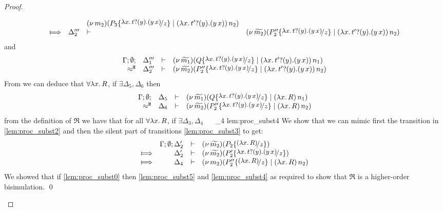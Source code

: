 \begin{proof}
\begin{enumerate}
\begin{itemize}
\begin{eqnarray}
\begin{array}{crll}
												&&	\newsp{m_2}{P_3 \subst{\trvalx{t}}{z} \Par \appl{(\trvalx{t'})}{n_2}}
									\\
									\Hby{}	& \Delta_2''' & \proves & \newsp{\widetilde{m_2}}{P_2'' \subst{\trvalx{t}}{z} \Par \appl{(\trvalx{t'})}{n_2}}
								\end{array}
								\label{lem:proc_subst3}
							\end{eqnarray}
							and
							\begin{eqnarray*}
								\mhorel{\Gamma}{\Delta_1'''}{\newsp{\widetilde{m_1}}{Q \subst{\trvalx{t}}{z} \Par \appl{(\trvalx{t'})}{n_1}}}
								{\hwb}
								{\Delta_2'''}{}{\newsp{\widetilde{m_2}}{P_2'' \subst{\trvalx{t}}{z} \Par \appl{(\trvalx{t'})}{n_2}}}
							\end{eqnarray*}
							From  we can deduce that $\forall \lambda x.\,R$, if $\exists \Delta_5, \Delta_6$ then
							\begin{eqnarray*}
								\mhorel{\Gamma}{\Delta_5}{\newsp{\widetilde{m_1}}{Q \subst{\trvalx{t}}{z} \Par \appl{(\abs{x}{R})}{n_1}}}
								{\hwb}
								{\Delta_6}{}{\newsp{\widetilde{m_2}}{P_2'' \subst{\trvalx{t}}{z} \Par \appl{(\abs{x}{R})}{n_2}}}
							\end{eqnarray*}
							from the definition of $\Re$ we have that for all $\forall \lambda x.\,R$, if $\exists \Delta_3, \Delta_4$
								{\ \Re\ }
								{\Delta_4}{}
								{lem:proc_subst4}
							We show that we can mimic first the
							transition in \eqref{lem:proc_subst2} and then the silent part of
							transitions \eqref{lem:proc_subst3} to get:
							\begin{eqnarray}
								\begin{array}{crll}
										& \Gamma; \es; \Delta_2' &\proves& \newsp{\widetilde{m_2}}{P_2 \subst{(\abs{x}{R})}{z}}
									\\
									\Hby{}	&	\Delta_2'			& \proves&	\newsp{\widetilde{m_2}}{P_2' \subst{\trvalx{t}}{z}}
									\\
									\Hby{} &	\Delta_4			& \proves&	\newsp{m_2}{P_2'' \subst{(\abs{x}{R})}{z} \Par \appl{(\abs{x}{R})}{n_2}}
								\end{array}
								\label{lem:proc_subst5}
							\end{eqnarray}
							We showed that if \eqref{lem:proc_subst0} then \eqref{lem:proc_subst5} and \eqref{lem:proc_subst4}
							as required to show that $\Re$ is a higher-order bisimulation.							\qed
				\end{itemize}
	\end{enumerate}
\end{proof}



